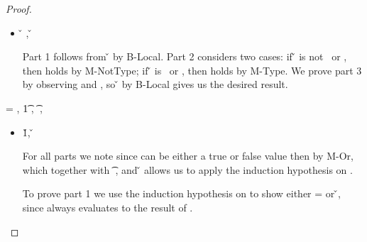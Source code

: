 \begin{lemma}
\begin{proof}
\begin{case}[T-Local]
\begin{itemize}
  \item[]
\begin{subcase}[B-Local]
{ \inopenv {\openv{}} {\x{}} {\v{}} },
{ \opsem {\openv{}} {\x{}} {\v{}} }

Part 1 follows from \inopenv{\openv{}}{\x{}} {\v{}} by B-Local.
Part 2 considers two cases: if \v{} is not \false\ or \nil, then 
\satisfies{\openv{}}{\notprop{\falsy}{\x{}}} holds by M-NotType; if \v{} is \false\ or \nil, then 
\satisfies{\openv{}}{\isprop{\falsy}{\x{}}} holds by M-Type.
We prove part 3 by observing
\inpropenv{\propenv{}}{\isprop{\t{}}{\x{}}}
and
\satisfies{\openv{}}{\propenv{}},
so
{ \inopenv {\openv{}} {\x{}} {\v{}} }
by B-Local
gives us the desired result.
\end{subcase}
\end{itemize}

\end{case}

\begin{case}[T-Do]
\e{} = { {}},
  \judgement {\propenv{}} 
             { {\t1}} 
             { {}} 
             {},
           { {\t{}}} 
           {\filterset {\thenprop {\prop{}}} {\elseprop {\prop{}}}} 
           {\object{}},

\begin{itemize}
  \item[] \begin{subcase}[B-Do]
  \opsem {\openv{}} {} {\v{1}},
  \opsem {\openv{}} {} {\v{}}

For all parts we note 
    since {} can be either a true or false value
    then
    {}
    by M-Or,
    which together with 
           { {\t{}}} 
           {\filterset {\thenprop {\prop{}}} {\elseprop {\prop{}}}} 
           {\object{}},
    and
  \opsem {\openv{}} {} {\v{}}
    allows us to apply the induction hypothesis on .

To prove part 1 we use the induction hypothesis on 
to show either \object{} = \emptyobject{} 
or \inopenv {\openv{}} {\object{}} {\v{}}, since \e{} always
evaluates to the result of .


\end{subcase}
\end{itemize}
\end{case}
\end{proof}
\end{lemma}
